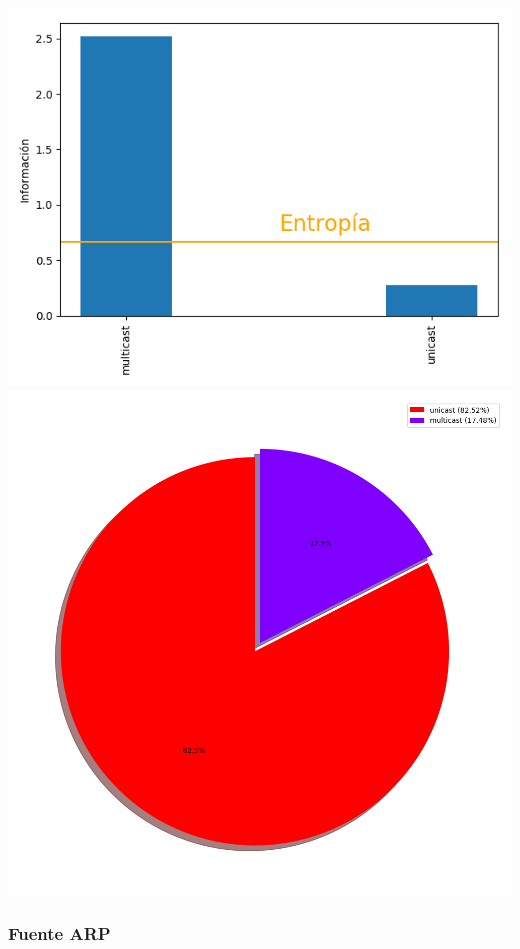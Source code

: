 \hspace*{-1.5cm}
 \includegraphics[scale=0.6]{../plots/labos_s1informacion.png}
 \includegraphics[scale=0.4]{../plots/labos_s1_probabilidades.png}

\subsubsection{Fuente ARP}

